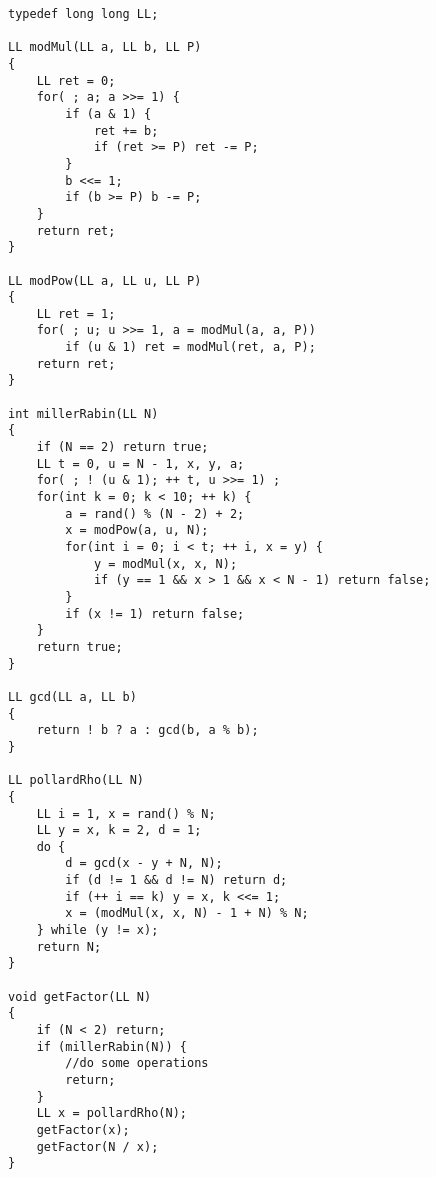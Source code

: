 \begin{lstlisting}
typedef long long LL;

LL modMul(LL a, LL b, LL P)
{
	LL ret = 0;
	for( ; a; a >>= 1) {
		if (a & 1) {
			ret += b;
			if (ret >= P) ret -= P;
		}
		b <<= 1;
		if (b >= P) b -= P;
	}
	return ret;
}

LL modPow(LL a, LL u, LL P)
{
	LL ret = 1;
	for( ; u; u >>= 1, a = modMul(a, a, P))
		if (u & 1) ret = modMul(ret, a, P);
	return ret;
}

int millerRabin(LL N)
{
	if (N == 2) return true;
	LL t = 0, u = N - 1, x, y, a;
	for( ; ! (u & 1); ++ t, u >>= 1) ;
	for(int k = 0; k < 10; ++ k) {
		a = rand() % (N - 2) + 2;
		x = modPow(a, u, N);
		for(int i = 0; i < t; ++ i, x = y) {
			y = modMul(x, x, N);
			if (y == 1 && x > 1 && x < N - 1) return false;
		}
		if (x != 1) return false;
	}
	return true;
}

LL gcd(LL a, LL b)
{
	return ! b ? a : gcd(b, a % b);
}

LL pollardRho(LL N)
{
	LL i = 1, x = rand() % N;
	LL y = x, k = 2, d = 1;
	do {
		d = gcd(x - y + N, N);
		if (d != 1 && d != N) return d;
		if (++ i == k) y = x, k <<= 1;
		x = (modMul(x, x, N) - 1 + N) % N;
	} while (y != x);
	return N;
}

void getFactor(LL N)
{
	if (N < 2) return;
	if (millerRabin(N)) {
		//do some operations
		return;
	}
	LL x = pollardRho(N);
	getFactor(x);
	getFactor(N / x);
}
\end{lstlisting}
